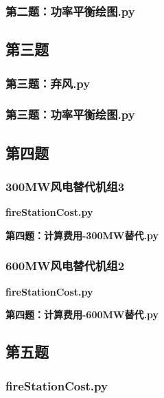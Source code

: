 \documentclass{cumcmthesis}
\begin{document}
\begin{appendices}
		\subsubsection{第二题：功率平衡绘图.py}
		
	\subsection{第三题}
	\subsubsection{第三题：弃风.py}
	
	\subsubsection{第三题：功率平衡绘图.py}
	
	\subsection{第四题}
	\subsubsection{300MW风电替代机组3}
	
	\textbf{fireStationCost.py}
	
	
	\textbf{第四题：计算费用-300MW替代.py}
	
	
	\subsubsection{600MW风电替代机组2}
	
	\textbf{fireStationCost.py}
	
	
	\textbf{第四题：计算费用-600MW替代.py}
	
	
	\subsection{第五题}
	\subsubsection{fireStationCost.py}
	

\end{appendices}
\end{document}
